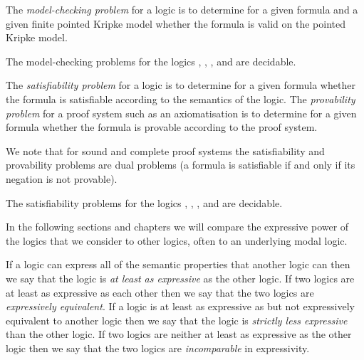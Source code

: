 \begin{definition}
The {\em model-checking problem} for a logic is to determine for a given formula and a given finite pointed Kripke model whether the formula is valid on the pointed Kripke model.
\end{definition}

\begin{proposition}
The model-checking problems for the logics \logicK{}, \logicKF{}, \logicKFF{}, \logicKD{} and \logicS{} are decidable.
\end{proposition}

\begin{definition}
The {\em satisfiability problem} for a logic is to determine for a given formula whether the formula is satisfiable according to the semantics of the logic.
The {\em provability problem} for a proof system such as an axiomatisation is to determine for a given formula whether the formula is provable according to the proof system.
\end{definition}

We note that for sound and complete proof systems the satisfiability and provability problems are dual problems (a formula is satisfiable if and only if its negation is not provable).

\begin{proposition}
The satisfiability problems for the logics \logicK{}, \logicKF{}, \logicKFF{}, \logicKD{} and \logicS{} are decidable.
\end{proposition}

In the following sections and chapters we will compare the expressive power of the logics that we consider to other logics, often to an underlying modal logic.

\pagebreak

\begin{definition}[Expressivity]
If a logic can express all of the semantic properties that another logic can then we say that the logic is {\em at least as expressive} as the other logic.
If two logics are at least as expressive as each other then we say that the two logics are {\em expressively equivalent}.
If a logic is at least as expressive as but not expressively equivalent to another logic then we say that the logic is {\em strictly less expressive} than the other logic.
If two logics are neither at least as expressive as the other logic then we say that the two logics are {\em incomparable} in expressivity.
\end{definition}
